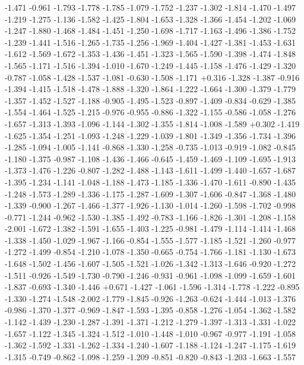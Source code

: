 \documentclass[9pt]{article}
\theoremstyle{plain}
\theoremstyle{definition}
\theoremstyle{remark}
\numberwithin{equation}{section}
\begin{document}
-1.471
-0.961
-1.793
-1.778
-1.785
-1.079
-1.752
-1.237
-1.302
-1.814
-1.470
-1.497
-1.219
-1.275
-1.136
-1.582
-1.425
-1.804
-1.653
-1.328
-1.366
-1.454
-1.202
-1.069
-1.247
-1.880
-1.468
-1.484
-1.451
-1.250
-1.698
-1.717
-1.163
-1.496
-1.386
-1.752
-1.239
-1.441
-1.516
-1.265
-1.735
-1.256
-1.969
-1.404
-1.427
-1.381
-1.453
-1.631
-1.612
-1.569
-1.672
-1.353
-1.436
-1.451
-1.323
-1.565
-1.590
-1.398
-1.474
-1.848
-1.565
-1.171
-1.516
-1.394
-1.010
-1.670
-1.249
-1.445
-1.158
-1.476
-1.429
-1.320
-0.787
-1.058
-1.428
-1.537
-1.081
-0.630
-1.508
-1.171
+0.316
-1.328
-1.387
-0.916
-1.394
-1.415
-1.518
-1.478
-1.888
-1.320
-1.864
-1.222
-1.664
-1.300
-1.379
-1.779
-1.357
-1.452
-1.527
-1.188
-0.905
-1.495
-1.523
-0.897
-1.409
-0.834
-0.629
-1.385
-1.554
-1.464
-1.525
-1.215
-0.976
-0.955
-0.886
-1.322
-1.155
-0.586
-1.058
-1.276
-1.657
-1.313
-1.393
-1.096
-1.144
-1.302
-1.355
-1.814
-1.008
-1.589
+0.302
-1.419
-1.625
-1.354
-1.251
-1.093
-1.248
-1.229
-1.039
-1.801
-1.349
-1.356
-1.734
-1.396
-1.285
-1.094
-1.005
-1.141
-0.868
-1.330
-1.258
-0.735
-1.013
-0.919
-1.082
-0.845
-1.180
-1.375
-0.987
-1.108
-1.436
-1.466
-0.645
-1.459
-1.469
-1.109
-1.695
-1.913
-1.373
-1.476
-1.226
-0.807
-1.282
-1.488
-1.143
-1.611
-1.499
-1.440
-1.657
-1.687
-1.395
-1.234
-1.141
-1.048
-1.188
-1.473
-1.185
-1.336
-1.470
-1.611
-0.890
-1.435
-1.248
-1.573
-1.289
-1.336
-1.175
-1.287
-1.609
-1.307
-1.606
-0.847
-1.368
-1.480
-1.339
-0.900
-1.267
-1.466
-1.377
-1.926
-1.130
-1.014
-1.260
-1.598
-1.702
-0.998
-0.771
-1.244
-0.962
-1.530
-1.385
-1.492
-0.783
-1.166
-1.826
-1.301
-1.208
-1.158
-2.001
-1.672
-1.382
-1.591
-1.655
-1.403
-1.225
-0.981
-1.479
-1.114
-1.414
-1.468
-1.338
-1.450
-1.029
-1.967
-1.166
-0.854
-1.555
-1.577
-1.185
-1.521
-1.260
-0.977
-1.272
-1.499
-0.854
-1.210
-1.078
-1.350
-0.665
-0.754
-1.766
-1.181
-1.130
-1.673
-1.648
-1.502
-1.456
-1.607
-1.505
-1.521
-1.026
-1.342
-1.313
-1.646
-0.920
-1.272
-1.511
-0.926
-1.549
-1.730
-0.790
-1.246
-0.931
-0.961
-1.098
-1.099
-1.659
-1.601
-1.837
-0.693
-1.340
-1.446
+0.671
-1.427
-1.061
-1.596
-1.314
-1.778
-1.222
-0.895
-1.330
-1.274
-1.548
-2.002
-1.779
-1.845
-0.926
-1.263
-0.624
-1.444
-1.013
-1.376
-0.986
-1.370
-1.377
-0.969
-1.847
-1.593
-1.395
-0.858
-1.276
-1.054
-1.362
-1.582
-1.142
-1.439
-1.230
-1.287
-1.391
-1.371
-1.212
-1.279
-1.397
-1.313
-1.331
-1.022
-1.657
-1.122
-1.345
-1.324
-1.512
-1.010
-1.448
-1.010
-0.967
-0.977
-1.191
-1.058
-1.362
-1.592
-1.331
-1.262
-1.334
-1.240
-1.607
-1.188
-1.124
-1.247
-1.175
-1.619
-1.315
-0.749
-0.862
-1.098
-1.259
-1.209
-0.851
-0.820
-0.843
-1.203
-1.663
-1.557
\end{document}

